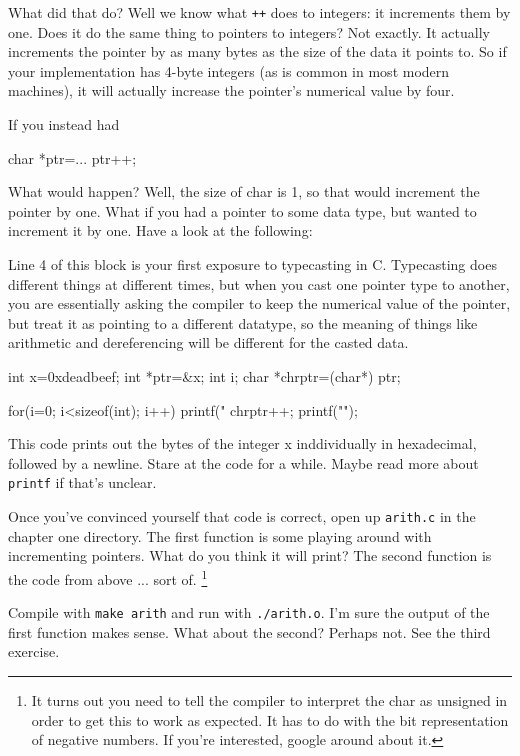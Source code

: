 \documentclass[ebook,11pt,oneside,openany]{memoir}
\begin{document}
What did that do? Well we know what \texttt{++} does to integers: it increments them by one. Does it do the same thing to pointers to integers? Not exactly. It actually increments the pointer by as many bytes as the size of the data it points to. So if your implementation has 4-byte integers (as is common in most modern machines), it will actually increase the pointer's numerical value by four.

If you instead had 

\begin{code}[language=C]
char *ptr=...
ptr++;
\end{code}

What would happen? Well, the size of char is 1, so that would increment the pointer by one. What if you had a pointer to some data type, but wanted to increment it by one. Have a look at the following:

Line 4 of this block is your first exposure to typecasting in C. Typecasting does different things at different times, but when you cast one pointer type to another, you are essentially asking the compiler to keep the numerical value of the pointer, but treat it as pointing to a different datatype, so the meaning of things like arithmetic and dereferencing will be different for the casted data.

\begin{code}[language=C]
int x=0xdeadbeef;
int *ptr=&x;
int i;
char *chrptr=(char*) ptr;

for(i=0; i<sizeof(int); i++) {
  printf("%
  chrptr++;
}
printf("\n");
\end{code}


This code prints out the bytes of the integer x inddividually in hexadecimal, followed by a newline.  Stare at the code for a while. Maybe read more about \texttt{printf} if that's unclear.

Once you've convinced yourself that code is correct, open up \texttt{arith.c} in the chapter one directory. The first function is some playing around with incrementing pointers. What do you think it will print? The second function is the code from above ... sort of. \footnote{It turns out you need to tell the compiler to interpret the char as unsigned in order to get this to work as expected. It has to do with the bit representation of negative numbers. If you're interested, google around about it.}

Compile with \texttt{make arith} and run with \texttt{./arith.o}. I'm sure the output of the first function makes sense. What about the second? Perhaps not. See the third exercise.
\end{document}
